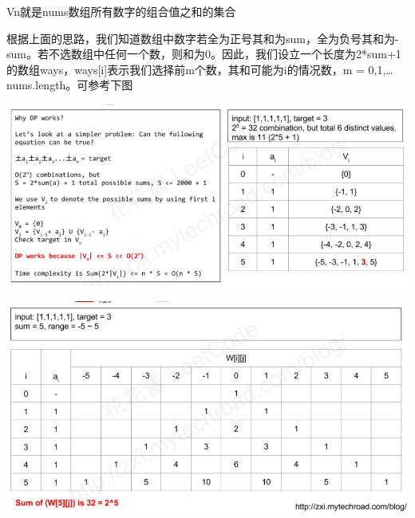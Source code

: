 \documentclass[9pt, b5paaper]{book}
\begin{document}
Vn就是nums数组所有数字的组合值之和的集合

根据上面的思路，我们知道数组中数字若全为正号其和为sum，全为负号其和为-sum。若不选数组中任何一个数，则和为0。因此，我们设立一个长度为2*sum+1的数组ways，ways[i]表示我们选择前m个数，其和可能为i的情况数，m = 0,1,\ldots{}nums.length。可参考下图

\includegraphics[width=.9\linewidth]{./pic/targetSum.png}

\includegraphics[width=.9\linewidth]{./pic/targetSum2.png}
\end{document}
